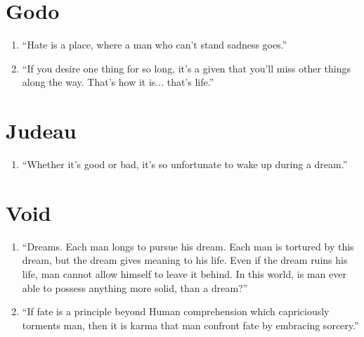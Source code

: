 \documentclass{book}
\numberwithin{equation}{section}
\begin{document}
\section{Godo}
\begin{enumerate}
    \item ``Hate is a place, where a man who can't stand sadness goes.''
    \item ``If you desire one thing for so long, it's a given that you'll miss other things along the way. That's how it is$\ldots$ that's life.''
\end{enumerate}

\section{Judeau}
\begin{enumerate}
    \item ``Whether it's good or bad, it's so unfortunate to wake up during a dream.''
\end{enumerate}

\section{Void}
\begin{enumerate}
    \item ``Dreams. Each man longs to pursue his dream. Each man is tortured by this dream, but the dream gives meaning to his life. Even if the dream ruins his life, man cannot allow himself to leave it behind. In this world, is man ever able to possess anything more solid, than a dream?''
    \item ``If fate is a principle beyond Human comprehension which capriciously torments man, then it is karma that man confront fate by embracing sorcery.''
\end{enumerate}
\end{document}
